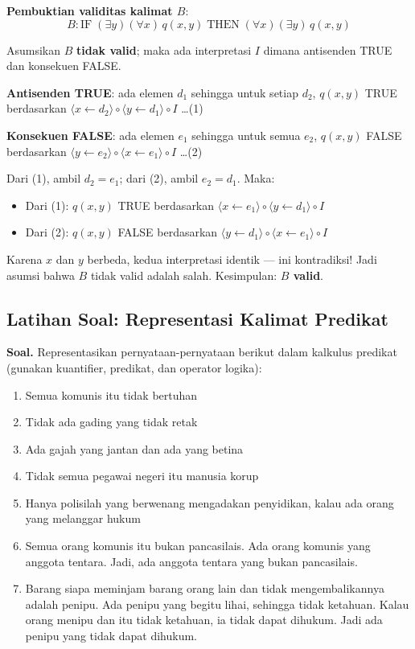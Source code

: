\begin{contoh}
\textbf{Pembuktian validitas kalimat $B$}:
$$B : \text{IF}\; (\exists y)(\forall x)\, q(x, y) \;\text{THEN}\; (\forall x)(\exists y)\, q(x, y)$$

Asumsikan $B$ \textbf{tidak valid}; maka ada interpretasi $I$ dimana antisenden TRUE dan konsekuen FALSE.

\textbf{Antisenden TRUE}: ada elemen $d_1$ sehingga untuk setiap $d_2$, $q(x, y)$ TRUE berdasarkan $\langle x \leftarrow d_2 \rangle \circ \langle y \leftarrow d_1 \rangle \circ I$ \quad\ldots(1)

\textbf{Konsekuen FALSE}: ada elemen $e_1$ sehingga untuk semua $e_2$, $q(x, y)$ FALSE berdasarkan $\langle y \leftarrow e_2 \rangle \circ \langle x \leftarrow e_1 \rangle \circ I$ \quad\ldots(2)

Dari (1), ambil $d_2 = e_1$; dari (2), ambil $e_2 = d_1$. Maka:
\begin{itemize}
  \item Dari (1): $q(x, y)$ TRUE berdasarkan $\langle x \leftarrow e_1 \rangle \circ \langle y \leftarrow d_1 \rangle \circ I$
  \item Dari (2): $q(x, y)$ FALSE berdasarkan $\langle y \leftarrow d_1 \rangle \circ \langle x \leftarrow e_1 \rangle \circ I$
\end{itemize}

Karena $x$ dan $y$ berbeda, kedua interpretasi identik --- ini kontradiksi! Jadi asumsi bahwa $B$ tidak valid adalah salah. Kesimpulan: \textbf{$B$ valid}.
\end{contoh}

\subsection{Latihan Soal: Representasi Kalimat Predikat}

\textbf{Soal.} Representasikan pernyataan-pernyataan berikut dalam kalkulus predikat (gunakan kuantifier, predikat, dan operator logika):

\begin{enumerate}
  \item Semua komunis itu tidak bertuhan
  \item Tidak ada gading yang tidak retak
  \item Ada gajah yang jantan dan ada yang betina
  \item Tidak semua pegawai negeri itu manusia korup
  \item Hanya polisilah yang berwenang mengadakan penyidikan, kalau ada orang yang melanggar hukum
  \item Semua orang komunis itu bukan pancasilais. Ada orang komunis yang anggota tentara. Jadi, ada anggota tentara yang bukan pancasilais.
  \item Barang siapa meminjam barang orang lain dan tidak mengembalikannya adalah penipu. Ada penipu yang begitu lihai, sehingga tidak ketahuan. Kalau orang menipu dan itu tidak ketahuan, ia tidak dapat dihukum. Jadi ada penipu yang tidak dapat dihukum.
\end{enumerate}

